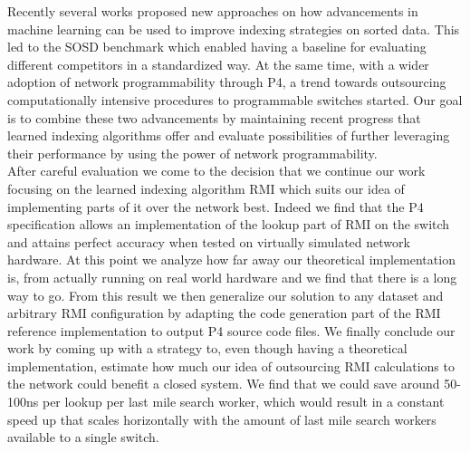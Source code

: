 Recently several works proposed new approaches on how advancements in machine learning can be used to improve indexing strategies on sorted data. This led to the SOSD benchmark \cite{sosd-vldb} which enabled having a baseline for evaluating different competitors in a standardized way. At the same time, with a wider adoption of network programmability through P4, a trend towards outsourcing computationally intensive procedures to programmable switches started. Our goal is to combine these two advancements by maintaining recent progress that learned indexing algorithms offer and evaluate possibilities of further leveraging their performance by using the power of network programmability.\\

After careful evaluation we come to the decision that we continue our work focusing on the learned indexing algorithm RMI \cite{rmi} which suits our idea of implementing parts of it over the network best. Indeed we find that the P4 specification \cite{p4-spec} allows an implementation of the lookup part of RMI on the switch and attains perfect accuracy when tested on virtually simulated network hardware. At this point we analyze how far away our theoretical implementation is, from actually running on real world hardware and we find that there is a long way to go. From this result we then generalize our solution to any dataset and arbitrary RMI configuration by adapting the code generation part of the RMI reference implementation \cite{cdfshop} to output P4 source code files. We finally conclude our work by coming up with a strategy to, even though having a theoretical implementation, estimate how much our idea of outsourcing RMI calculations to the network could benefit a closed system. We find that we could save around 50-100ns per lookup per last mile search worker, which would result in a constant speed up that scales horizontally with the amount of last mile search workers available to a single switch.
